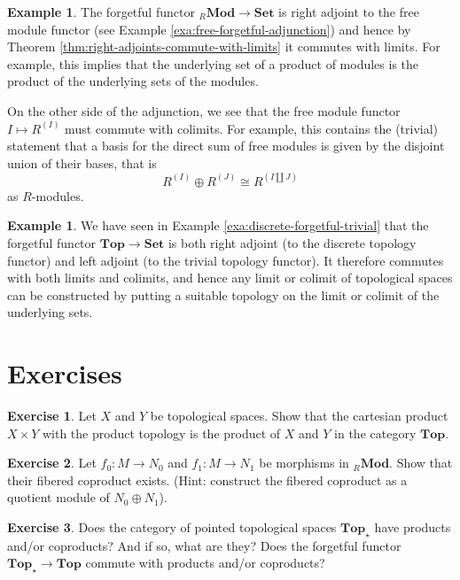 \documentclass[11pt]{amsbook}
\renewcommand{\ast}{\star}
\DeclareMathOperator\Mod{{\bf{Mod}}}
\def\Set{\mathbf{Set}}
\def\Top{\mathbf{Top}}
\def\Mod{\mathbf{Mod}}
\theoremstyle{plain}
\theoremstyle{definition}
\newtheorem{example}[theorem]{Example}
\newtheorem{exercise}{Exercise}
\begin{document}
\begin{example}The forgetful functor ${}_R\Mod \to \Set$ is right adjoint to the free module functor 
(see Example \ref{exa:free-forgetful-adjunction}) and hence by Theorem \ref{thm:right-adjoints-commute-with-limits} it commutes with limits. For example, this implies that the underlying set of a product of modules is the product of the underlying sets of the modules. 

On the other side of the adjunction, we see that the free module functor $I \mapsto R^{(I)}$ must commute with colimits. For example, this contains the (trivial) statement that a basis for the direct sum of free modules is given by the disjoint union of their bases, that is
\[
	R^{(I)} \oplus R^{(J)} \cong R^{(I\amalg J)}
\]
as $R$-modules.
\end{example}

\begin{example}We have seen in Example \ref{exa:discrete-forgetful-trivial} that the forgetful functor $\Top\to \Set$ is both right adjoint (to the discrete topology functor) and left adjoint (to the trivial topology functor). It therefore commutes with both limits and colimits, and hence any limit or colimit of topological spaces can be constructed by putting a suitable topology on the limit or colimit of the underlying sets.
\end{example}




\newpage
\section*{Exercises}


\begin{exercise}
Let $X$ and $Y$ be topological spaces. Show that the cartesian product $X\times Y$ with the product topology is the product of $X$ and $Y$ in the category $\Top$.
\end{exercise}

\begin{exercise}\label{exc:fibered-coproduct-in-Ab}
Let $f_0\colon M\to N_0$ and $f_1\colon M\to N_1$ be morphisms in ${}_R\Mod$. Show that their fibered coproduct exists. (Hint: construct the fibered coproduct as a quotient module of $N_0\oplus N_1$).
\end{exercise}


\begin{exercise}Does the category of pointed topological spaces $\Top_\ast$ have products and/or coproducts? And if so, what are they? Does the forgetful functor $\Top_\ast \to \Top$ commute with products and/or coproducts? 
\end{exercise}
\end{document}
